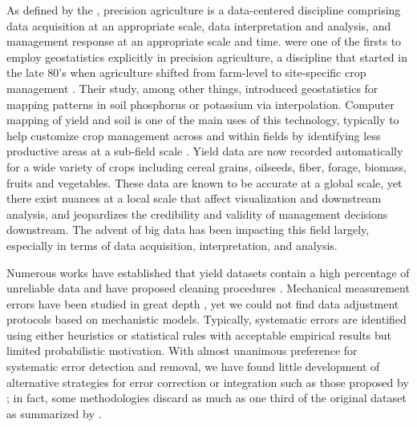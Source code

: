 \documentclass[12pt]{article}
\begin{document}
As defined by the \citet{Council1997}, precision agriculture is a
data-centered discipline comprising data acquisition at an appropriate
scale, data interpretation and analysis, and management response at an
appropriate scale and time. \cite{Miller1988} were one of the firsts
to employ geostatistics explicitly in precision agriculture, a
discipline that started in the late 80's when agriculture shifted from
farm-level to site-specific crop management \citep{Oliver2010}. Their
study, among other things, introduced geostatistics for mapping
patterns in soil phosphorus or potassium via interpolation. Computer
mapping of yield and soil is one of the main uses of this technology,
typically to help customize crop management across and within fields
by identifying less productive areas at a sub-field scale
\citep{Lowenberg-DeBoer2019}. Yield data are now recorded
automatically for a wide variety of crops including cereal grains,
oilseeds, fiber, forage, biomass, fruits and vegetables. These data
are known to be accurate at a global scale, yet there exist nuances at
a local scale that affect visualization and downstream analysis, and
jeopardizes the credibility and validity of management decisions
downstream. The advent of big data has been impacting this field
largely, especially in terms of data acquisition, interpretation, and
analysis.

Numerous works have established that yield datasets contain a high
percentage of unreliable data and have proposed cleaning procedures
\citep{Blackmore1996, Moore1998, Blackmore1999, Thylen2000, Noack2003,
  Simbahan2004, Ping2005, Sudduth2007, Sudduth2012, Spekken2013,
  Leroux2018, Leroux2019, Vega2019}. Mechanical measurement errors
have been studied in great depth \citep{Arslan1999, Arslan2002,
  Grisso2002, Burks2004, Hemming2005, Fulton2009, Schuster2017}, yet
we could not find data adjustment protocols based on mechanistic
models. Typically, systematic errors are identified using either
heuristics or statistical rules with acceptable empirical results but
limited probabilistic motivation. With almost unanimous preference for
systematic error detection and removal, we have found little
development of alternative strategies for error correction or
integration such as those proposed by \cite{Bachmaier2007,
  Bachmaier2010}; in fact, some methodologies discard as much as one
third of the original dataset as summarized by \cite{Lyle2013}.
\end{document}
